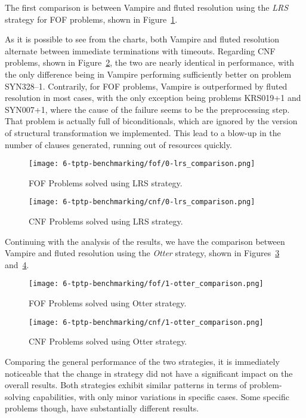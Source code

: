 The first comparison is between Vampire and fluted resolution using the \emph{LRS} strategy for FOF problems, shown in Figure~\ref{fig:fof-lrs}.

As it is possible to see from the charts, both Vampire and fluted resolution alternate between immediate terminations with timeouts.
Regarding CNF problems, shown in Figure~\ref{fig:cnf-lrs}, the two are nearly identical in performance, with the only difference being in Vampire performing sufficiently better on problem SYN328--1.
Contrarily, for FOF problems, Vampire is outperformed by fluted resolution in most cases, with the only exception being problems KRS019+1 and SYN007+1, where the cause of the failure seems to be the preprocessing step.
That problem is actually full of biconditionals, which are ignored by the version of structural transformation we implemented. This lead to a blow-up in the number of clauses generated, running out of resources quickly.
\begin{figure}[H]
  \centering
  \texttt{[image: 6-tptp-benchmarking/fof/0-lrs\_comparison.png]}
  \caption{FOF Problems solved using LRS strategy.}\label{fig:fof-lrs}
\end{figure}

\begin{figure}[H]
  \centering
  \texttt{[image: 6-tptp-benchmarking/cnf/0-lrs\_comparison.png]}
  \caption{CNF Problems solved using LRS strategy.}\label{fig:cnf-lrs}
\end{figure}



Continuing with the analysis of the results, we have the comparison between Vampire and fluted resolution using the \emph{Otter} strategy, shown in Figures~\ref{fig:fof-otter} and~\ref{fig:cnf-otter}.

\begin{figure}[H]
  \centering
  \texttt{[image: 6-tptp-benchmarking/fof/1-otter\_comparison.png]}
  \caption{FOF Problems solved using Otter strategy.}\label{fig:fof-otter}
\end{figure}

\begin{figure}[H]
  \centering
  \texttt{[image: 6-tptp-benchmarking/cnf/1-otter\_comparison.png]}
  \caption{CNF Problems solved using Otter strategy.}\label{fig:cnf-otter}
\end{figure}

Comparing the general performance of the two strategies, it is immediately noticeable that the change in strategy did not have a significant impact on the overall results. Both strategies exhibit similar patterns in terms of problem-solving capabilities, with only minor variations in specific cases.
Some specific problems though, have substantially different results.

